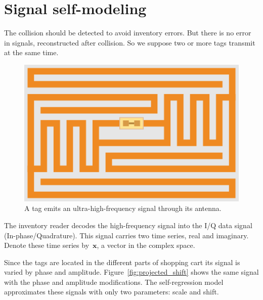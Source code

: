 \documentclass[12pt]{article}
\begin{document}
\section{Signal self-modeling}
The collision should be detected to avoid inventory errors. But there is no error in signals, reconstructed after collision. So we suppose two or more tags transmit at the same time. 
\begin{figure}  %
\centering
\includegraphics[width=\linewidth]{EPC-RFID-TAG.svg.png}
\caption{A tag emits an ultra-high-frequency signal through its antenna.}
\label{fig:antenna}%
\end{figure}
The inventory reader decodes the high-frequency signal into the I/Q data signal (In-phase/Quadrature). This signal carries two time series, real and imaginary. Denote these time series by~$\mathbf{x}$, a vector in the complex space. 

Since the tags are located in the different parts of shopping cart its signal is varied by phase and amplitude. Figure~\ref{fig:projected_shift} shows the same signal with the phase and amplitude modifications. The self-regression model approximates these signals with only two parameters: scale and shift.
\end{document}
